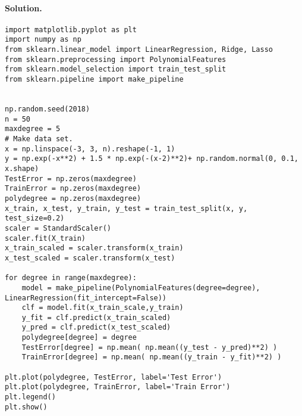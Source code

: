 \documentclass[%
oneside,                 %
final,                   %
10pt]{article}
\newenvironment{doconceexercise}{}{}
\begin{document}
\begin{doconceexercise}
\paragraph{Solution.}





































\begin{verbatim}
import matplotlib.pyplot as plt
import numpy as np
from sklearn.linear_model import LinearRegression, Ridge, Lasso
from sklearn.preprocessing import PolynomialFeatures
from sklearn.model_selection import train_test_split
from sklearn.pipeline import make_pipeline


np.random.seed(2018)
n = 50
maxdegree = 5
# Make data set.
x = np.linspace(-3, 3, n).reshape(-1, 1)
y = np.exp(-x**2) + 1.5 * np.exp(-(x-2)**2)+ np.random.normal(0, 0.1, x.shape)
TestError = np.zeros(maxdegree)
TrainError = np.zeros(maxdegree)
polydegree = np.zeros(maxdegree)
x_train, x_test, y_train, y_test = train_test_split(x, y, test_size=0.2)
scaler = StandardScaler()
scaler.fit(X_train)
x_train_scaled = scaler.transform(x_train)
x_test_scaled = scaler.transform(x_test)

for degree in range(maxdegree):
    model = make_pipeline(PolynomialFeatures(degree=degree), LinearRegression(fit_intercept=False))
    clf = model.fit(x_train_scale,y_train)
    y_fit = clf.predict(x_train_scaled)
    y_pred = clf.predict(x_test_scaled) 
    polydegree[degree] = degree
    TestError[degree] = np.mean( np.mean((y_test - y_pred)**2) )
    TrainError[degree] = np.mean( np.mean((y_train - y_fit)**2) )

plt.plot(polydegree, TestError, label='Test Error')
plt.plot(polydegree, TrainError, label='Train Error')
plt.legend()
plt.show()


\end{verbatim}
\end{doconceexercise}
\end{document}
